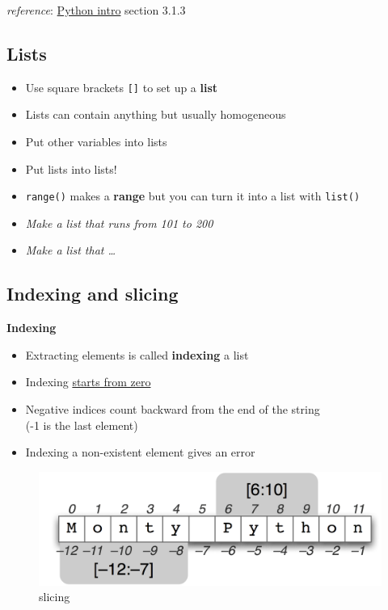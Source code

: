 \documentclass[]{tufte-handout}
\begin{document}
\emph{reference}:
\href{https://docs.python.org/3/tutorial/introduction.html}{Python
intro} section 3.1.3

\subsection{Lists}\label{lists}

\begin{itemize}
\item
  Use square brackets \texttt{{[}{]}} to set up a \textbf{list}
\item
  Lists can contain anything but usually homogeneous
\item
  Put other variables into lists
\item
  Put lists into lists!
\item
  \texttt{range()} makes a \textbf{range} but you can turn it into a
  list with \texttt{list()}
\item
  \emph{Make a list that runs from 101 to 200}
\item
  \emph{Make a list that \ldots{} }
\end{itemize}

\subsection{Indexing and slicing}\label{indexing-and-slicing}

\textbf{Indexing}

\begin{itemize}
\itemsep1pt\parskip0pt
\item
  Extracting elements is called \textbf{indexing} a list
\item
  Indexing \href{http://xkcd.com/163/}{starts from zero}
\item
  Negative indices count backward from the end of the string\\(-1 is the
  last element)
\item
  Indexing a non-existent element gives an error
\end{itemize}

\begin{figure}[htbp]
\centering
\includegraphics{pix/string-slicing.png}
\caption{slicing}
\end{figure}
\end{document}
